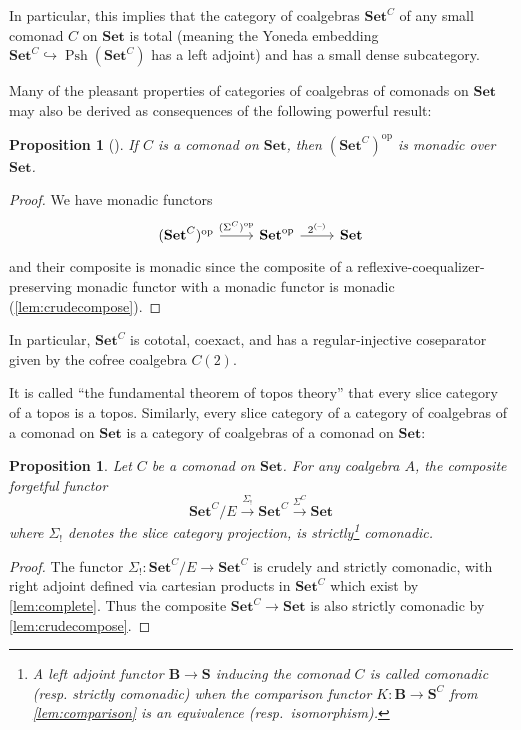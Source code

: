 \documentclass[11pt, oneside, article]{memoir}
\theoremstyle{plain}
\newtheorem{proposition}[theorem]{Proposition}
\theoremstyle{definition}
\theoremstyle{remark}
\DeclareMathOperator{\Psh}{Psh}
\DeclareMathOperator{\ophelper}{op}
\newcommand{\dash}{{\mathord{\text{--}}}}
\newcommand{\op}{^{\ophelper}}
\newcommand{\xto}[1]{\xrightarrow{#1}}
\newcommand{\bang}{\mathrm{!}}
\newcommand{\Pow}[1]{2^{#1}}
\newcommand{\namedcat}[1]{\mathbf{#1}}
\newcommand{\cat}[1]{\mathbf{#1}}
\newcommand{\Set}{\namedcat{Set}}
\newcommand{\CoalgOn}[2]{{#2}^{#1}}
\newcommand{\CoalgSet}[1]{\CoalgOn{#1}{\Set}}
\newcommand{\CoalgS}[1]{\CoalgOn{#1}{\bS}}
\newcommand{\carr}{\Sigma}
\newcommand{\slicel}{\Sigma_\bang}
\newcommand{\car}[1]{\carr^{#1}}
\newcommand{\carC}{\car{\cC}}
\newcommand{\Ps}[1]{\Psh(#1)}
\newcommand{\cmnd}[1]{{#1}}
\newcommand{\eE}{E}
\newcommand{\cC}{\cmnd{C}}
\newcommand{\bB}{\cat{B}}
\newcommand{\bS}{\cat{S}}
\newcommand{\CSet}{\CoalgSet{\cC}}
\newcommand{\CS}{\CoalgS{\cC}}
\begin{document}
In particular, this implies that the category of coalgebras $\CSet$ of
any small comonad $\cC$ on $\Set$ is total (meaning the Yoneda
embedding $\CSet \hookrightarrow \Ps{\CSet}$ has a left adjoint) and has a small
dense subcategory.

Many of the pleasant properties of categories of coalgebras of
comonads on $\Set$ may also be derived as consequences of the
following powerful result:

\begin{proposition}[{\cite{linton-pare}}]\label{lem:opmonadic}
  If $\cC$ is a comonad on $\Set$, then $(\CSet)\op$ is monadic over
  $\Set$.
\end{proposition}
\begin{proof}
  We have monadic functors
  \[\begin{tikzcd}
      {(\CSet)\op} & {\Set\op} & \Set
      \arrow["(\carC)\op", from=1-1, to=1-2]
      \arrow["{\Pow{(\dash)}}", from=1-2, to=1-3]
    \end{tikzcd}\] and their composite is monadic since the composite
  of a reflexive-coequalizer-preserving monadic functor with a monadic
  functor is monadic (\cref{lem:crudecompose}).
\end{proof}

In particular, $\CSet$ is cototal, coexact, and has a
regular-injective coseparator~\cite{vitale} given by the cofree
coalgebra $\cC(2)$.


It is called ``the fundamental theorem of topos theory'' that every
slice category of a topos is a topos. Similarly, every slice category
of a category of coalgebras of a comonad on $\Set$ is a category of
coalgebras of a comonad on $\Set$:

\begin{proposition}\label{prop:fundamental}
  Let $\cC$ be a comonad on $\Set$. For any coalgebra $A$, the
  composite forgetful functor
  \[\CSet / \eE \xto{\slicel} \CSet \xto{\carC} \Set\]
  where $\slicel$ denotes the slice category projection, is
  strictly\footnote{A left adjoint functor $\bB \to \bS$ inducing the
    comonad $\cC$ is called comonadic (resp. \emph{strictly}
    comonadic) when the comparison functor $K \colon \bB \to \CS$ from
    \cref{lem:comparison} is an equivalence (resp.\
    \emph{isomorphism}).} comonadic.
\end{proposition}
\begin{proof}
  The functor $\slicel \colon \CSet / \eE \to \CSet$ is crudely and
  strictly comonadic, with right adjoint defined via cartesian
  products in $\CSet$ which exist by \cref{lem:complete}. Thus the
  composite $\CSet \to \Set$ is also strictly comonadic by
  \cref{lem:crudecompose}.
\end{proof}
\end{document}
